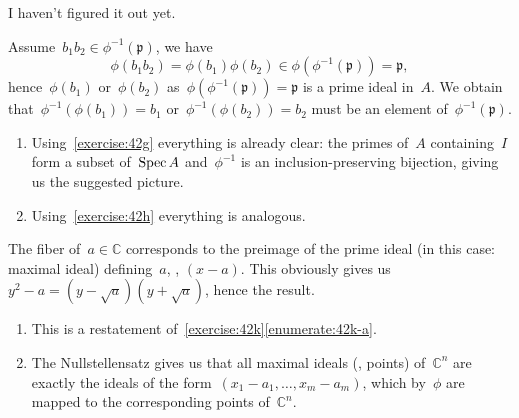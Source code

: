 \begin{exercise} %
  I haven't figured it out yet.
\end{exercise}

\begin{exercise}
  \label{exercise:42j}
  Assume~$b_1b_2\in\phi^{-1}(\mathfrak{p})$, we have
  \begin{equation}
    \phi(b_1b_2)=\phi(b_1)\phi(b_2)\in\phi\left( \phi^{-1}(\mathfrak{p}) \right)=\mathfrak{p},
  \end{equation}
  hence~$\phi(b_1)$ or~$\phi(b_2)$ as~$\phi(\phi^{-1}(\mathfrak{p}))=\mathfrak{p}$ is a prime ideal in~$A$. We obtain that~$\phi^{-1}(\phi(b_1))=b_1$ or~$\phi^{-1}(\phi(b_2))=b_2$ must be an element of~$\phi^{-1}(\mathfrak{p})$.
\end{exercise}

\begin{exercise}
  \label{exercise:42k}
  \begin{enumerate}
    \item\label{enumerate:42k-a} Using~\autoref{exercise:42g} everything is already clear: the primes of~$A$ containing~$I$ form a subset of~$\operatorname{Spec} A$ and~$\phi^{-1}$ is an inclusion-preserving bijection, giving us the suggested picture.

    \item Using~\autoref{exercise:42h} everything is analogous.
  \end{enumerate}
\end{exercise}

\begin{exercise}
  The fiber of~$a\in\mathbb{C}$ corresponds to the preimage of the prime ideal (in this case: maximal ideal) defining~$a$, \ie, $(x-a)$. This obviously gives us~$y^2-a=(y-\sqrt{a})(y+\sqrt{a})$, hence the result.
\end{exercise}

\begin{exercise} %
  \begin{enumerate}
    \item This is a restatement of~\autoref{exercise:42k}\ref{enumerate:42k-a}.

    \item The Nullstellensatz gives us that all maximal ideals (\ie, points) of~$\mathbb{C}^n$ are exactly the ideals of the form~$(x_1-a_1,\ldots,x_m-a_m)$, which by~$\phi$ are mapped to the corresponding points of~$\mathbb{C}^n$.
  \end{enumerate}
\end{exercise}

